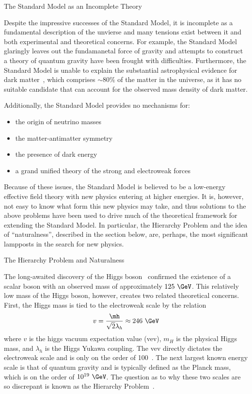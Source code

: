\begin{section}{The Standard Model as an Incomplete Theory}

Despite the impressive successes of the Standard Model, it is incomplete as a fundamental description of the unvierse and many tensions exist between it and both experimental and theoretical concerns.
For example, the Standard Model glaringly leaves out the fundamanetal force of gravity and attempts to construct a theory of quantum gravity have been frought with difficulties.
Furthermore, the Standard Model is unable to explain the substantial astrophysical evidence for dark matter~\cite{Bertone:2004pz,Rubin:1970zza}, which comprises $\sim 80\%$ of the matter in the universe, as it has no suitable candidate that can account for the observed mass density of dark matter.

Additionally, the Standard Model provides no mechanisms for:
\begin{itemize}
\item the origin of neutrino masses
\item the matter-antimatter symmetry
\item the presence of dark energy
\item a grand unified theory of the strong and electroweak forces
\end{itemize}

Because of these issues, the Standard Model is believed to be a low-energy effective field theory with new physics entering at higher energies.
It is, however, not easy to know what form this new physics may take, and thus solutions to the above problems have been used to drive much of the theoretical framework for extending the Standard Model.
In particular, the Hierarchy Problem and the idea of ``naturalness'', described in the section below, are, perhaps, the most significant lampposts in the search for new physics.

\begin{subsection}{The Hierarchy Problem and Naturalness}

The long-awaited discovery of the Higgs boson~\cite{Aad:2012tfa,Chatrchyan:2012xdj,Chatrchyan:2013lba,Khachatryan:2014jba,Aad:2014aba,Aad:2015zhl} confirmed the existence of a scalar boson with an observed mass of approximately $125~\GeV$.
This relatively low mass of the Higgs boson, however, creates two related theoretical concerns.
First, the Higgs mass is tied to the electroweak scale by the relation 
\begin{align}
v = \frac{\mh}{\sqrt{2}\lambda_h} \approx 246~\GeV
\end{align}
where $v$ is the higgs vacuum expectation value (vev), $m_H$ is the physical Higgs mass, and $\lambda_h$ is the Higgs Yukawa coupling.
The vev directly dictates the electroweak scale and is only on the order of 100~\GeV.
The next largest known energy scale is that of quantum gravity and is typically defined as the Planck mass, which is on the order of $10^{19}~\GeV$.
The question as to why these two scales are so discrepant is known as the Hierarchy Problem~\cite{Barbieri:1987fn}.


\end{subsection}
\end{section}
